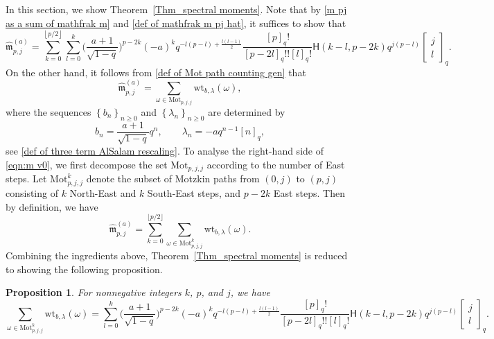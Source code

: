 \documentclass{amsart}
\newcommand{\qbinom}[2]{{\begin{bmatrix}#1\\#2\end{bmatrix}}_q}
\newcommand{\floor}[1]{\left\lfloor#1\right\rfloor}
\newcommand{\set}[1]{\left\{#1\right\}}
\theoremstyle{plain}
\newtheorem{prop}[thm]{Proposition}
\theoremstyle{remark}
\numberwithin{equation}{section}
\begin{document}
In this section, we show Theorem~\ref{Thm_spectral moments}. Note that by \eqref{m pj as a sum of mathfrak m} and \eqref{def of mathfrak m pj hat}, it suffices to show that  \begin{equation}
 \widehat{\mathfrak{m}}^{(a)}_{p,j} = \sum_{k=0}^{\floor{p/2}}\sum_{l=0}^k \Big(\frac{a+1}{\sqrt{1-q}}\Big)^{p-2k}(-a)^{k}q^{-l(p-l)+\frac{l(l-1)}{2}}\frac{[p]_{q}!}{[p-2l]_{q}!![l]_{q}!}\mathsf{H}(k-l,p-2k)q^{j(p-l)}\qbinom{j}{l} . \label{eqn:mpj}  
\end{equation}
On the other hand, it follows from \eqref{def of Mot path counting gen} that  
\begin{equation}  \label{eqn:m v0}
 \widehat{\mathfrak{m}}_{p,j}^{(a)} = \sum_{\omega\in\mathrm{Mot}_{p,j,j}}\mathrm{wt}_{b,\lambda}(\omega), 
\end{equation}
where the sequences $\set{b_n}_{n\geq0}$ and $\set{\lambda_n}_{n\geq0}$ are determined by 
\begin{equation} \label{def of three term coeff AlSalam}
    b_n=\frac{a+1}{\sqrt{1-q}}q^n, \qquad \lambda_{n}=-aq^{n-1}[n]_q,
\end{equation} 
see \eqref{def of three term AlSalam rescaling}. To analyse the right-hand side of \eqref{eqn:m v0}, we first decompose the set $\mathrm{Mot}_{p,j,j}$ according to the number of East steps. Let $\mathrm{Mot}_{p,j,j}^{k}$ denote the subset of Motzkin paths from $(0,j)$ to $(p,j)$ consisting of $k$ North-East and $k$ South-East steps, and $p - 2k$ East steps. Then by definition, we have 
\begin{equation}\label{eqn:m}
\widehat{\mathfrak{m}}_{p,j}^{(a)} = \sum_{k=0}^{\lfloor p/2 \rfloor} \sum_{\omega \in \mathrm{Mot}_{p,j,j}^{k}} \mathrm{wt}_{b,\lambda}(\omega).
\end{equation}
Combining the ingredients above, Theorem~\ref{Thm_spectral moments} is reduced to showing the following proposition.


\begin{prop} \label{Prop_spectral moments combinatorics}
For nonnegative integers $k$, $p$, and $j$, we have 
\begin{equation}\label{eqn:spectral moment via weight}
\sum_{\omega\in\mathrm{Mot}^{k}_{p,j,j}}\mathrm{wt}_{b,\lambda}(\omega) = \sum_{l=0}^k \Big(\frac{a+1}{\sqrt{1-q}}\Big)^{p-2k}(-a)^{k}q^{-l(p-l)+\frac{l(l-1)}{2}}\frac{[p]_{q}!}{[p-2l]_{q}!![l]_{q}!}\mathsf{H}(k-l,p-2k)q^{j(p-l)}\qbinom{j}{l} . 
\end{equation}
\end{prop}
\end{document}
